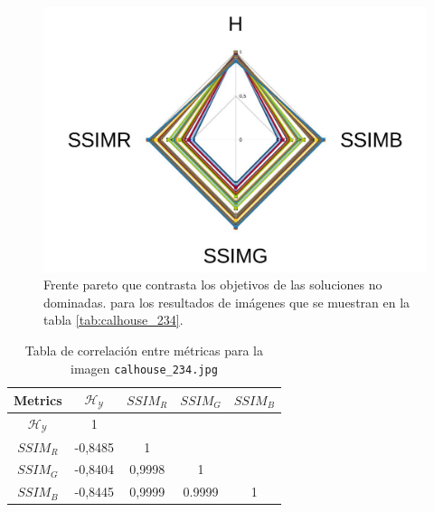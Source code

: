     \begin{figure}[H]
    \centering
    \includegraphics[width=\textwidth]{./Figures/calhouse_234/calhouse_234_2.jpg}
    \caption{Frente pareto que contrasta los objetivos de las soluciones no dominadas. para los resultados de imágenes que se muestran en la tabla \ref{tab:calhouse_234}.}
    \label{fig:calhouse2342fp}
    \end{figure}

\begin{table}[H]
\setlength{\abovecaptionskip}{2pt plus 3pt minus 2pt} %
\caption[Parámetros de entrada para $MOPSO$]{Tabla de correlación entre métricas para la imagen \texttt{calhouse\_234.jpg}}
\begin{center}
 \begin{tabular}{||c | c c c c||} 
 \hline
Metrics & $\mathscr{H_Y}$ & $SSIM_R$ & $SSIM_G$ & $SSIM_B$ \\ 
\hline
$\mathscr{H_Y}$ & 1 &  &  & \\ 
\hline
$SSIM_R$ & -0,8485 & 1 &  \\ 
\hline
$SSIM_G$ & -0,8404 & 0,9998  & 1  & \\ 
\hline
$SSIM_B$ & -0,8445 & 0,9999  & 0.9999  & 1 \\ 
\hline
\end{tabular}
\end{center}
\label{table:correlacion}
\end{table}


